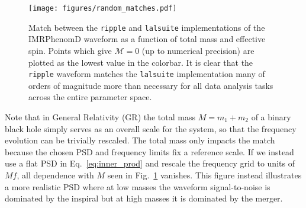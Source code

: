 \documentclass[twocolumn]{aastex631}
\newcommand{\ripple}{\texttt{ripple}\xspace}
\newcommand{\lalsuite}{\texttt{lalsuite}\xspace}
\newcommand{\te}[1]{\textbf{\color{pyGreen}(TE: #1)}}
\newcommand{\AZ}[1]{{\color{Burnt}[AZ: #1]}}
\newcommand{\mi}[1]{\textbf{\color{teal}(MI: #1)}}
\newcommand{\dfm}[1]{{\color{dfm}[DFM: #1]}}
\begin{document}
\begin{figure}[t]
    \begin{centering}
        \texttt{[image: figures/random\_matches.pdf]}
        \caption{
            Match between the \ripple and \lalsuite implementations of the IMRPhenomD waveform as a function of total mass and effective spin. 
            Points which give $\mathcal{M}=0$ (up to numerical precision) are plotted as the lowest value in the colorbar.
            It is clear that the \ripple waveform matches the \lalsuite implementation many of orders of magnitude more than necessary for all data analysis tasks across the entire parameter space.
        }
        \label{fig:match}
    \end{centering}
\end{figure}

Note that in General Relativity (GR) the total mass $M = m_1 + m_2$ of a binary black hole simply serves as an overall scale for the system, so that the frequency evolution can be trivially rescaled.
The total mass only impacts the match because the chosen PSD and frequency limits fix a reference scale.
If we instead use a flat PSD in Eq.~\eqref{eq:inner_prod} and rescale the frequency grid to units of $Mf$, all dependence with $M$ seen in Fig.~\ref{fig:match} vanishes. 
This figure instead illustrates a more realistic PSD where at low masses the waveform signal-to-noise is dominated by the inspiral but at high masses it is dominated by the merger.
\end{document}
